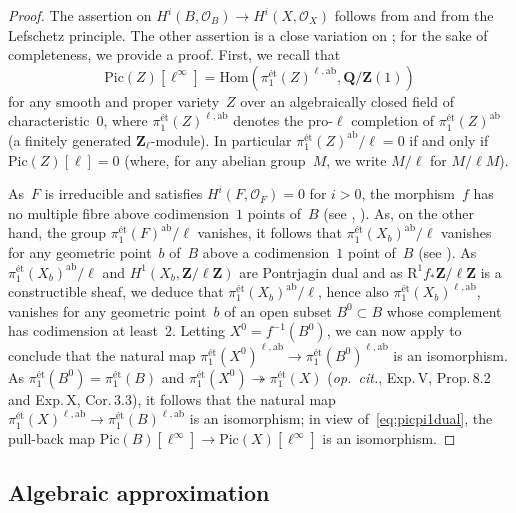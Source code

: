 \documentclass[JEP,XML,SOM,Unicode]{cedram}
\theoremstyle{plain}
\theoremstyle{definition}
\numberwithin{equation}{section}
\newcommand{\sO}{{\mathscr O}}
\newcommand{\Q}{{\mathbf Q}}
\newcommand{\Z}{{\mathbf Z}}
\newcommand{\Zl}{{\Z_{\ell}}}
\newcommand{\Pic}{\mathrm{Pic}}
\newcommand{\Hom}{{\mathrm{Hom}}}
\newcommand{\et}{\text{ét}}
\newcommand{\ab}{\mathrm{ab}}
\newcommand{\RR}{{\mathrm{R}}}
\begin{document}
\begin{proof}
The assertion on $H^i(B,\sO_B)\to H^i(X,\sO_X)$ follows from \cite[Th.\,7.1]{kollartorsionfree}
and from the Lefschetz principle.
The other assertion
is a close variation on \cite[Th.\,5.2]{kollarshaf};
for the sake of completeness, we provide a proof.
First,
we recall that
\begin{equation}
\label{eq:picpi1dual}
\Pic(Z)[\ell^\infty]=\Hom(\pi_1^\et(Z)^{\ell,\ab},\Q/\Z(1))
\end{equation}
for any smooth and
proper variety~$Z$ over an algebraically closed field of characteristic~$0$,
where $\pi_1^\et(Z)^{\ell,\ab}$ denotes the pro\nobreakdash-$\ell$ completion
of $\pi_1^\et(Z)^\ab$ (a finitely generated $\Zl$\nobreakdash-module).
In particular $\pi_1^\et(Z)^\ab/\ell=0$ if and only if $\Pic(Z)[\ell]=0$
(where, for any abelian group~$M$, we write $M/\ell$ for $M/\ell M$).

As~$F$ is irreducible and satisfies $H^i(F,\sO_F)=0$ for $i>0$, the morphism~$f$ has no multiple
fibre above codimension~$1$ points of~$B$ (see \cite[Prop.\,7.3\,(iii)]{ctvoisin}, \cite[Prop.\,2.4]{elw}).
As, on the other hand, the group $\pi_1^\et(F)^\ab/\ell$ vanishes, it follows that $\pi_1^\et(X_b)^\ab/\ell$ vanishes
for any geometric point~$b$ of~$B$ above a codimension~$1$
point of~$B$ (see \cite[Prop.\,6.3.5\,(ii)\,a)]{Raynaud}).
As $\pi_1^\et(X_b)^\ab/\ell$ and $H^1(X_b,\Z/\ell\Z)$ are Pontrjagin dual and as
$\RR^1f_*\Z/\ell\Z$ is a constructible sheaf, we deduce that $\pi_1^\et(X_b)^\ab/\ell$,
hence also $\pi_1^\et(X_b)^{\ell,\ab}$, vanishes
for any geometric point~$b$ of an open subset $B^0 \subset B$ whose complement has codimension at least~$2$.
Letting $X^0=f^{-1}(B^0)$,
we can now apply \cite[Exp.\,IX, Cor.\,6.11]{SGA1}
to conclude that the natural map $\pi_1^\et(X^0)^{\ell,\ab} \to \pi_1^\et(B^0)^{\ell,\ab}$
is an isomorphism.
As $\pi_1^\et(B^0)=\pi_1^\et(B)$ and $\pi_1^\et(X^0)\twoheadrightarrow \pi_1^\et(X)$ (\emph{op.\ cit.},
Exp.\,V, Prop.\,8.2 and Exp.\,X, Cor.\,3.3),
it follows that the natural map
$\pi_1^\et(X)^{\ell,\ab} \to \pi_1^\et(B)^{\ell,\ab}$ is an isomorphism;
\ie
in view of~\eqref{eq:picpi1dual},
the pull-back map $\Pic(B)[\ell^\infty] \to \Pic(X)[\ell^\infty]$ is an isomorphism.
\end{proof}

\subsection{Algebraic approximation}
\label{subsec:algebraic approximation}
\end{document}
